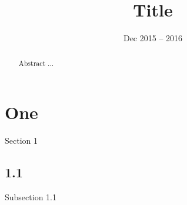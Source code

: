 \documentclass{article}
\title{Title}
\date{Dec 2015 -- 2016}
\begin{document}
\maketitle
\begin{abstract}
Abstract ...
\end{abstract}
\tableofcontents

\section{One}
Section 1

\subsection{1.1}
Subsection 1.1
\end{document}
